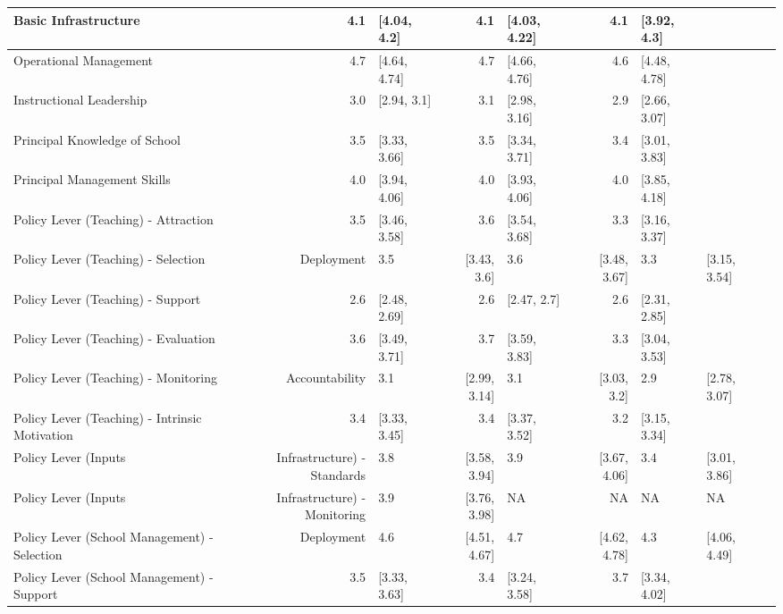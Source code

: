 \documentclass[
]{article}
\begin{document}
\begin{table}
\begin{tabular}[t]{l|r|l|r|l|r|l|l}
Basic Infrastructure & 4.1 & [4.04, 4.2] & 4.1 & [4.03, 4.22] & 4.1 & [3.92, 4.3] & \\
\hline
Operational Management & 4.7 & [4.64, 4.74] & 4.7 & [4.66, 4.76] & 4.6 & [4.48, 4.78] & \\
\hline
Instructional Leadership & 3.0 & [2.94, 3.1] & 3.1 & [2.98, 3.16] & 2.9 & [2.66, 3.07] & \\
\hline
Principal Knowledge of School & 3.5 & [3.33, 3.66] & 3.5 & [3.34, 3.71] & 3.4 & [3.01, 3.83] & \\
\hline
Principal Management Skills & 4.0 & [3.94, 4.06] & 4.0 & [3.93, 4.06] & 4.0 & [3.85, 4.18] & \\
\hline
Policy Lever (Teaching) - Attraction & 3.5 & [3.46, 3.58] & 3.6 & [3.54, 3.68] & 3.3 & [3.16, 3.37] & \\
\hline
Policy Lever (Teaching) - Selection & Deployment & 3.5 & [3.43, 3.6] & 3.6 & [3.48, 3.67] & 3.3 & [3.15, 3.54] & \\
\hline
Policy Lever (Teaching) - Support & 2.6 & [2.48, 2.69] & 2.6 & [2.47, 2.7] & 2.6 & [2.31, 2.85] & \\
\hline
Policy Lever (Teaching) - Evaluation & 3.6 & [3.49, 3.71] & 3.7 & [3.59, 3.83] & 3.3 & [3.04, 3.53] & \\
\hline
Policy Lever (Teaching) - Monitoring & Accountability & 3.1 & [2.99, 3.14] & 3.1 & [3.03, 3.2] & 2.9 & [2.78, 3.07] & \\
\hline
Policy Lever (Teaching) - Intrinsic Motivation & 3.4 & [3.33, 3.45] & 3.4 & [3.37, 3.52] & 3.2 & [3.15, 3.34] & \\
\hline
Policy Lever (Inputs & Infrastructure) - Standards & 3.8 & [3.58, 3.94] & 3.9 & [3.67, 4.06] & 3.4 & [3.01, 3.86] & \\
\hline
Policy Lever (Inputs & Infrastructure) - Monitoring & 3.9 & [3.76, 3.98] & NA & NA & NA & NA & \\
\hline
Policy Lever (School Management) - Selection & Deployment & 4.6 & [4.51, 4.67] & 4.7 & [4.62, 4.78] & 4.3 & [4.06, 4.49] & \\
\hline
Policy Lever (School Management) - Support & 3.5 & [3.33, 3.63] & 3.4 & [3.24, 3.58] & 3.7 & [3.34, 4.02] & \\

\end{tabular}
\end{table}
\end{document}
